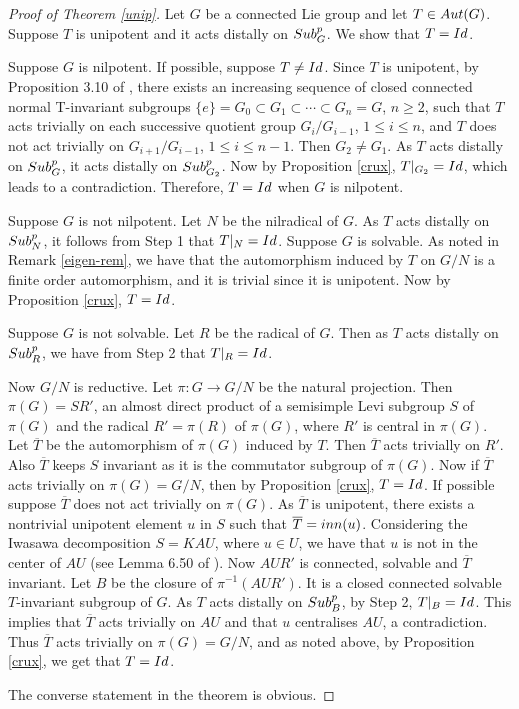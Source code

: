 \documentclass{amsart}
\numberwithin{equation}{section}
\newcommand{\Aut}{{\rm Aut}}
\newcommand{\spg}{{\rm Sub}^p_G}
\newcommand{\spp}{{\rm Sub}^{p}}
\newcommand{\Id}{{\rm Id}}
\newcommand{\inn}{{\rm inn}}
\newcommand{\T}{{\overline{T}}}
\theoremstyle{remark}
\begin{document}
\begin{proof}[Proof of Theorem \rm{\ref{unip}}]
Let $G$ be a connected Lie group and let $T\in\Aut(G)$. Suppose $T$ is unipotent and it acts distally on $\spg$. 
We show that $T=\Id$. 

\smallskip
{} Suppose $G$ is nilpotent. If possible, suppose $T\ne\Id$. Since $T$ is unipotent, 
by Proposition 3.10 of \cite{SY3}, there exists an increasing sequence of closed connected normal 
T-invariant subgroups $\{e\} = G_0 \subset G_1 \subset \cdots\subset G_n = G$, $n \geq 2$, such that 
$T$ acts trivially on each successive quotient group $G_i/G_{i-1}$, $1\leq i\leq n$, and $T$ does not act 
trivially on $G_{i+1}/G_{i-1}$, $1\leq  i \leq n -1$. Then $G_2\ne G_1$. As $T$ acts distally on $\spg$, 
it acts distally on $\spp_{G_2}$. Now by Proposition \ref{crux}, $T|_{G_2}=\Id$, 
 which leads to a contradiction. Therefore, $T=\Id$ when $G$ is nilpotent. 

\smallskip
{} Suppose $G$ is not nilpotent. Let $N$ be the nilradical of $G$. As $T$ acts distally on $\spp_N$, 
it follows from Step 1 that $T|_N=\Id$. Suppose $G$ is solvable.  As noted in Remark \ref{eigen-rem}, we have that the 
automorphism induced by $T$ on $G/N$ is a finite order automorphism, and it is trivial since it is unipotent. 
Now by Proposition \ref{crux}, $T=\Id$. 

\smallskip
{} Suppose $G$ is not solvable. Let $R$ be the radical of $G$. Then as $T$ acts 
distally on $\spp_R$, we have from Step 2 that $T|_R=\Id$. 

Now $G/N$ is reductive. Let $\pi:G\to G/N$ be the natural projection. Then  $\pi(G)=SR'$, 
an almost direct product of a 
semisimple Levi subgroup $S$ of $\pi(G)$ and the radical $R'=\pi(R)$ of $\pi(G)$, where $R'$ is central in $\pi(G)$. 
Let $\T$ be the automorphism of $\pi(G)$ induced by $T$. Then $\T$ acts trivially on $R'$. Also
$\T$ keeps $S$ invariant as it is the commutator subgroup of $\pi(G)$. Now if $\T$ acts trivially on
$\pi(G)=G/N$, then by Proposition \ref{crux}, $T=\Id$. If possible suppose $\T$ does not act trivially on $\pi(G)$.
As $\T$ is unipotent, there exists a nontrivial unipotent element $u$ in $S$ such that $\T=\inn(u)$. Considering the Iwasawa 
decomposition $S=KAU$, where $u\in U$, we have that $u$ is not in the center of $AU$ (see Lemma 6.50 of \cite{Kn}). 
Now $AUR'$ is connected, solvable and $\T$ invariant. 
Let $B$ be the closure of $\pi^{-1}(AUR')$. It is a closed connected solvable $T$-invariant subgroup of $G$. 
As $T$ acts distally on $\spp_B$, by Step 2, $T|_B=\Id$. This implies that $\T$ 
acts trivially on $AU$ and that $u$ centralises $AU$, a contradiction. Thus $\T$ acts trivially on $\pi(G)=G/N$, 
and as noted above, by Proposition \ref{crux}, we get that $T=\Id$. 

The converse statement in the theorem is obvious.
\end{proof}
\end{document}
